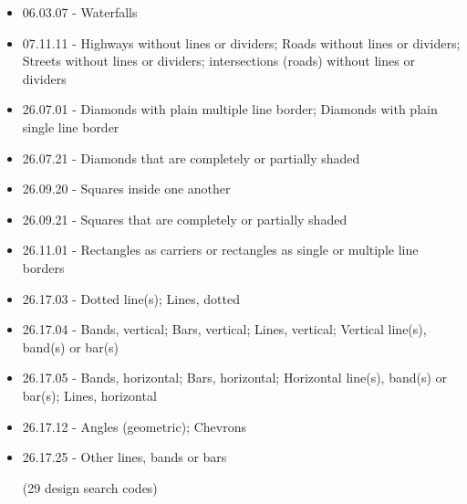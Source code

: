 \documentclass[aspectratio=1610]{beamer}
\begin{document}
\begin{frame}
\begin{minipage}{.5\textwidth}
\begin{itemize}
\item 06.03.07 - Waterfalls
\item 07.11.11 - Highways without lines or dividers; Roads without lines or dividers; Streets without lines or dividers; intersections (roads) without lines or dividers
\item 26.07.01 - Diamonds with plain multiple line border; Diamonds with plain single line border
\item 26.07.21 - Diamonds that are completely or partially shaded
\item 26.09.20 - Squares inside one another
\item 26.09.21 - Squares that are completely or partially shaded
\item 26.11.01 - Rectangles as carriers or rectangles as single or multiple line borders
\item 26.17.03 - Dotted line(s); Lines, dotted
\item 26.17.04 - Bands, vertical; Bars, vertical; Lines, vertical; Vertical line(s), band(s) or bar(s)
\item 26.17.05 - Bands, horizontal; Bars, horizontal; Horizontal line(s), band(s) or bar(s); Lines, horizontal
\item 26.17.12 - Angles (geometric); Chevrons
\item 26.17.25 - Other lines, bands or bars

\medskip

\tiny

(29 design search codes)

\end{itemize}
\end{minipage}

\end{frame}
\end{document}

